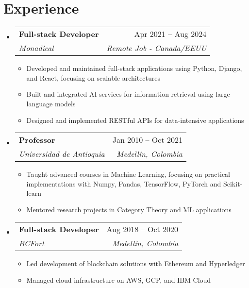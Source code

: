 \documentclass[letterpaper,11pt]{article}
\makeatletter
\newcommand{\resumeSubheading}[4]{
  \vspace{-2pt}
  \item[]
  \begin{tabular*}{\textwidth}{@{\extracolsep{\fill}}l r}
    \textbf{#1} & #2 \\
    \textit{#3} & \textit{#4} \\
  \end{tabular*}
  \vspace{-5pt}
}
\makeatother
\begin{document}
\section{Experience}
\begin{itemize}[leftmargin=0pt, itemindent=0pt, label={}]
\resumeSubheading
{Full-stack Developer}{Apr 2021 -- Aug 2024}
{Monadical}{Remote Job - Canada/EEUU}
\begin{itemize}[leftmargin=*]
    \item Developed and maintained full-stack applications using Python, Django, and React, focusing on scalable architectures
    \item Built and integrated AI services for information retrieval using large language models
    \item Designed and implemented RESTful APIs for data-intensive applications
\end{itemize}

\resumeSubheading
{Professor}{Jan 2010 -- Oct 2021}
{Universidad de Antioquia}{Medellín, Colombia}
\begin{itemize}[leftmargin=*]
    \item Taught advanced courses in Machine Learning, focusing on practical implementations with Numpy, Pandas, TensorFlow, PyTorch and Scikit-learn
    \item Mentored research projects in Category Theory and ML applications
\end{itemize}

\resumeSubheading
{Full-stack Developer}{Aug 2018 -- Oct 2020}
{BCFort}{Medellín, Colombia}
\begin{itemize}[leftmargin=*]
    \item Led development of blockchain solutions with Ethereum and Hyperledger
    \item Managed cloud infrastructure on AWS, GCP, and IBM Cloud
\end{itemize}
\end{itemize}
\end{document}

